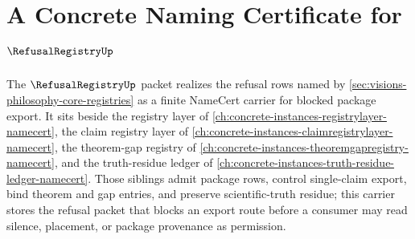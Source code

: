 \chapter{A Concrete Naming Certificate for $\RefusalRegistryUp$}
\label{ch:concrete-instances-refusalregistry-namecert}

The $\RefusalRegistryUp$ packet realizes the refusal rows named by \autoref{sec:visions-philosophy-core-registries} as a finite NameCert carrier for blocked package export. It sits beside the registry layer of \autoref{ch:concrete-instances-registrylayer-namecert}, the claim registry layer of \autoref{ch:concrete-instances-claimregistrylayer-namecert}, the theorem-gap registry of \autoref{ch:concrete-instances-theoremgapregistry-namecert}, and the truth-residue ledger of \autoref{ch:concrete-instances-truth-residue-ledger-namecert}. Those siblings admit package rows, control single-claim export, bind theorem and gap entries, and preserve scientific-truth residue; this carrier stores the refusal packet that blocks an export route before a consumer may read silence, placement, or package provenance as permission.

